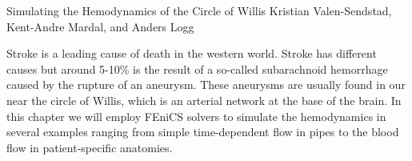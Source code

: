               {Simulating the Hemodynamics of the Circle of Willis}
              {Kristian Valen-Sendstad, Kent-Andre Mardal, and Anders Logg}

\editornote{[kvs-2]}

Stroke is a leading cause of death in the western world. Stroke has
different causes but around 5-10\% is the result of a so-called
subarachnoid hemorrhage caused by the rupture of an aneurysm. These
aneurysms are usually found in our near the circle of Willis, which is
an arterial network at the base of the brain.  In this chapter we will
employ FEniCS solvers to simulate the hemodynamics in several examples
ranging from simple time-dependent flow in pipes to the blood flow in
patient-specific anatomies.
